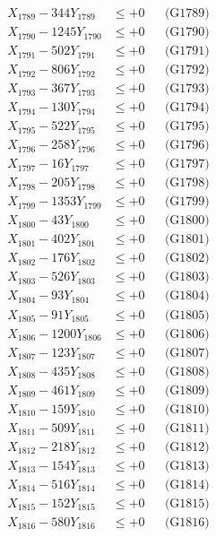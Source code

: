 \documentclass[a4paper,10pt]{article}
\begin{document}
{\begin{align}
X_{1789} - 344Y_{1789} &\leq +0 && \text{(G1789)} \\
X_{1790} - 1245Y_{1790} &\leq +0 && \text{(G1790)} \\
\allowbreak
X_{1791} - 502Y_{1791} &\leq +0 && \text{(G1791)} \\
X_{1792} - 806Y_{1792} &\leq +0 && \text{(G1792)} \\
X_{1793} - 367Y_{1793} &\leq +0 && \text{(G1793)} \\
X_{1794} - 130Y_{1794} &\leq +0 && \text{(G1794)} \\
X_{1795} - 522Y_{1795} &\leq +0 && \text{(G1795)} \\
X_{1796} - 258Y_{1796} &\leq +0 && \text{(G1796)} \\
X_{1797} - 16Y_{1797} &\leq +0 && \text{(G1797)} \\
X_{1798} - 205Y_{1798} &\leq +0 && \text{(G1798)} \\
X_{1799} - 1353Y_{1799} &\leq +0 && \text{(G1799)} \\
X_{1800} - 43Y_{1800} &\leq +0 && \text{(G1800)} \\
\allowbreak
X_{1801} - 402Y_{1801} &\leq +0 && \text{(G1801)} \\
X_{1802} - 176Y_{1802} &\leq +0 && \text{(G1802)} \\
X_{1803} - 526Y_{1803} &\leq +0 && \text{(G1803)} \\
X_{1804} - 93Y_{1804} &\leq +0 && \text{(G1804)} \\
X_{1805} - 91Y_{1805} &\leq +0 && \text{(G1805)} \\
X_{1806} - 1200Y_{1806} &\leq +0 && \text{(G1806)} \\
X_{1807} - 123Y_{1807} &\leq +0 && \text{(G1807)} \\
X_{1808} - 435Y_{1808} &\leq +0 && \text{(G1808)} \\
X_{1809} - 461Y_{1809} &\leq +0 && \text{(G1809)} \\
X_{1810} - 159Y_{1810} &\leq +0 && \text{(G1810)} \\
\allowbreak
X_{1811} - 509Y_{1811} &\leq +0 && \text{(G1811)} \\
X_{1812} - 218Y_{1812} &\leq +0 && \text{(G1812)} \\
X_{1813} - 154Y_{1813} &\leq +0 && \text{(G1813)} \\
X_{1814} - 516Y_{1814} &\leq +0 && \text{(G1814)} \\
X_{1815} - 152Y_{1815} &\leq +0 && \text{(G1815)} \\
X_{1816} - 580Y_{1816} &\leq +0 && \text{(G1816)} \\

\end{align}}
\end{document}

